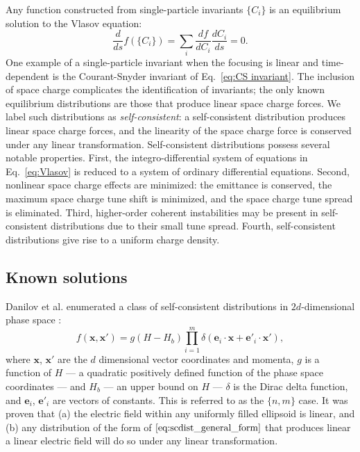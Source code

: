 Any function constructed from single-particle invariants $\{C_i\}$ is an equilibrium solution to the Vlasov equation:
%
\begin{equation}\label{eq:vlasov_equilibria}
    \frac{d}{ds} f(\{C_i\}) = \sum_{i}{\frac{df}{dC_i}\frac{dC_i}{ds}} = 0.
\end{equation}
%
One example of a single-particle invariant when the focusing is linear and time-dependent is the Courant-Snyder invariant of Eq.~\eqref{eq:CS invariant}. The inclusion of space charge complicates the identification of invariants; the only known equilibrium distributions are those that produce linear space charge forces. We label such distributions as \textit{self-consistent}: a self-consistent distribution produces linear space charge forces, and the linearity of the space charge force is conserved under any linear transformation. 
Self-consistent distributions possess several notable properties. First, the integro-differential system of equations in Eq.~\eqref{eq:Vlasov} is reduced to a system of ordinary differential equations. Second, nonlinear space charge effects are minimized: the emittance is conserved, the maximum space charge tune shift is minimized, and the space charge tune spread is eliminated. Third, higher-order coherent instabilities may be present in self-consistent distributions due to their small tune spread. Fourth, self-consistent distributions give rise to a uniform charge density.



\subsection{Known solutions}

Danilov et al. enumerated a class of self-consistent distributions in $2d$-dimensional phase space \cite{Danilov2003}: 
%
\begin{equation}\label{eq:scdist_general_form}
    f\left({\mathbf{x}, \mathbf{x}'}\right) = 
    g\left({H - H_b}\right)
    \prod_{i=1}^{m}\delta\left({\mathbf{e}_i \cdot \mathbf{x} 
    + \mathbf{e}'_i \cdot \mathbf{x}'}\right),
\end{equation}
%
where $\mathbf{x}$, $\mathbf{x}'$ are the $d$ dimensional vector coordinates and momenta, $g$ is a function of $H$ — a quadratic positively defined function of the phase space coordinates — and $H_b$ — an upper bound on $H$ — $\delta$ is the Dirac delta function, and $\mathbf{e}_i$, $\mathbf{e}'_i$ are vectors of constants. This is referred to as the $\{n,m\}$ case. It was proven that (a) the electric field within any uniformly filled ellipsoid is linear, and (b) any distribution of the form of $\eqref{eq:scdist_general_form}$ that produces linear a linear electric field will do so under any linear transformation. 


